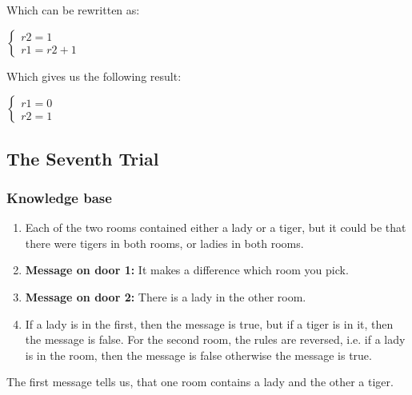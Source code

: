 Which can be rewritten as: 

\begin{center}
\begin{math}
\begin{cases}
 r2 = 1\\
 r1 = r2 + 1
\end{cases}
\end{math} 
\end{center}

Which gives us the following result:

\begin{center}
\begin{math}
\begin{cases}
 r1 = 0\\
 r2 = 1
\end{cases}
\end{math} 
\end{center}






\subsection{The Seventh Trial}

\subsubsection{Knowledge base}

\begin{enumerate}

\item Each of the two rooms contained either a lady or a tiger, but it could be that there were tigers in both rooms, or ladies in both rooms.

\item \textbf{Message on door 1:} It makes a difference which room you pick.

\item \textbf{Message on door 2:} There is a lady in the other room.


\item If a lady is in the first, then the message is true, but if a tiger is in it, then the message is false. For the second room, the rules are reversed, i.e. if a lady is in the room, then the message is false otherwise the message is true.

\end{enumerate}


The first message tells us, that one room contains a lady and the other a tiger.


